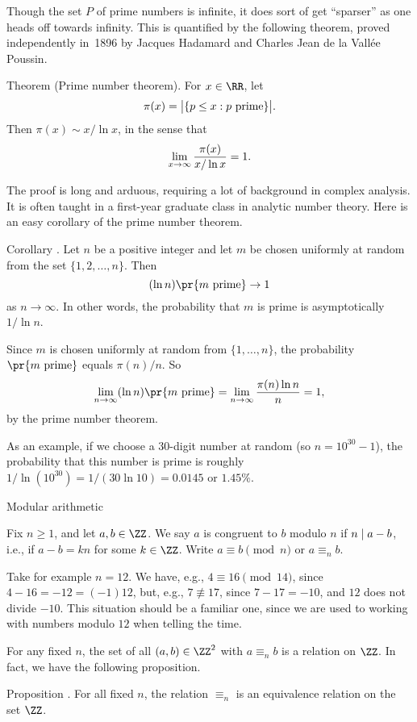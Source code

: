 Though the set $P$ of prime numbers is infinite, it does sort of get ``sparser'' as one heads off
towards infinity. This is quantified by the following theorem, proved independently
in~1896 by Jacques Hadamard and Charles Jean de la Vall\'ee Poussin.

\parenproclaim Theorem {\advthm} (Prime number theorem). For $x\in \RR$, let
$$\pi(x) = \bigl| \{ p \le x : p\ \hbox{prime}\} \bigr|.$$
Then $\pi(x) \sim x/\ln x$, in the sense that
$$\lim_{x\to\infty} {\pi(x)\over x/\ln x} = 1.$$

The proof is long and arduous, requiring a lot of background in complex analysis.
It is often taught in a first-year graduate class in analytic number theory.
Here is an easy corollary of the prime number theorem.

\proclaim Corollary \advthm. Let $n$ be a positive integer and let $m$ be chosen
uniformly at random from the set $\{1,2,\ldots, n\}$. Then
$$(\ln n)\pr\{m\ \hbox{prime}\}\to 1$$
as $n\to\infty$. In other words, the probability that $m$ is prime is asymptotically
$1/\ln n$.

\proof Since $m$ is chosen uniformly at random from $\{1,\ldots,n\}$,
the probability $\pr\{ m\ \hbox{prime}\}$ equals $\pi(n)/ n$. So
$$\lim_{n\to\infty} (\ln n) \pr\{m\ \hbox{prime}\} = \lim_{n\to\infty} {\pi(n) \ln n\over n} 
= 1,$$
by the prime number theorem.\slug

As an example, if we choose a $30$-digit number at random (so $n=10^{30} - 1$), the
probability that this number is prime is roughly $1/\ln(10^{30}) = 1/(30\ln 10) = 0.0145$
or $1.45\%$.

\advsect Modular arithmetic

Fix $n\ge 1$, and let $a,b\in\ZZ$. We say {$a$ is congruent to $b$ modulo $n$}
if $n\mid a-b$, i.e., if $a-b = kn$ for some $k\in \ZZ$. Write $a \equiv b\pmod n$
or $a \equiv_n b$.

Take for example $n=12$. We have, e.g., $4\equiv 16\pmod 14$, since $4-16 = -12 = (-1)12$,
but, e.g., $7\not\equiv 17$, since $7-17 = -10$, and $12$ does not divide $-10$. This
situation should be a familiar one, since we are used to working with numbers modulo $12$ when
telling the time.

For any fixed $n$, the set of all $(a,b)\in \ZZ^2$ with $a\equiv_n b$ is a relation on $\ZZ$.
In fact, we have the following proposition.

\proclaim Proposition \advthm.
For all fixed $n$, the relation $\equiv_n$ is an equivalence relation on the set $\ZZ$.

